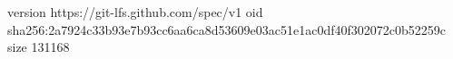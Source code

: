 version https://git-lfs.github.com/spec/v1
oid sha256:2a7924c33b93e7b93cc6aa6ca8d53609e03ac51e1ac0df40f302072c0b52259c
size 131168
